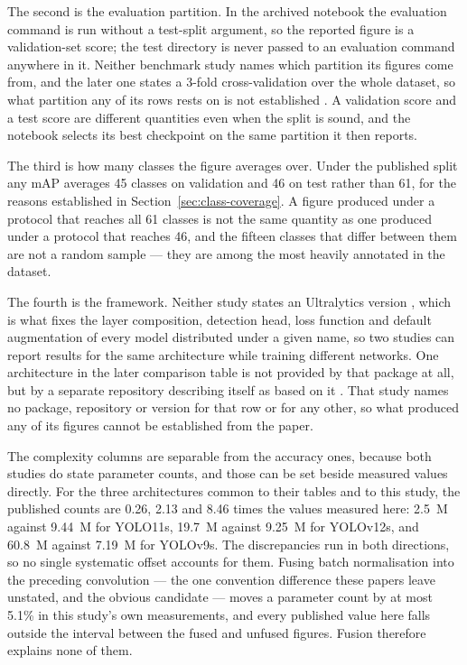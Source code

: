 The second is the evaluation partition. In the archived notebook the evaluation
command is run without a test-split argument, so the reported figure is a
validation-set score; the test directory is never passed to an evaluation
command anywhere in it. Neither benchmark study names which partition its figures
come from, and the later one states a 3-fold cross-validation over the whole
dataset, so what partition any of its rows rests on is not established
\citep{yolov13paper}. A
validation score and a test score are different quantities even when the split
is sound, and the notebook selects its best checkpoint on
the same partition it then reports.

The third is how many classes the figure averages over. Under the published
split any mAP averages 45 classes on validation and 46 on test rather than 61,
for the reasons established in Section~\ref{sec:class-coverage}. A figure
produced under a protocol that reaches all 61 classes is not the same quantity
as one produced under a protocol that reaches 46, and the fifteen classes that
differ between them are not a random sample --- they are among the most heavily
annotated in the dataset.

The fourth is the framework. Neither study states an Ultralytics version
\citep{ultralytics}, which is what fixes the layer composition, detection head,
loss function and default augmentation of every model distributed under a given
name, so two studies can report results for the same architecture while training
different networks. One architecture in the later comparison table is not
provided by that package at all, but by a separate repository describing itself
as based on it \citep{yolov13,yolov13repo}. That study names no package,
repository or version for that row or for any other, so what produced any of its
figures cannot be established from the paper.

The complexity columns are separable from the accuracy ones, because both
studies do state parameter counts, and those can be set beside measured values
directly. For the three architectures common to their tables and to this study,
the published counts are 0.26, 2.13 and 8.46 times the values measured here:
2.5~M against 9.44~M for YOLO11s, 19.7~M against 9.25~M for YOLOv12s, and
60.8~M against 7.19~M for YOLOv9s. The discrepancies run in both directions, so
no single systematic offset accounts for them. Fusing batch normalisation into
the preceding convolution --- the one convention difference these papers leave
unstated, and the obvious candidate --- moves a parameter count by at most 5.1\%
in this study's own measurements, and every published value here falls outside
the interval between the fused and unfused figures. Fusion therefore explains
none of them.

